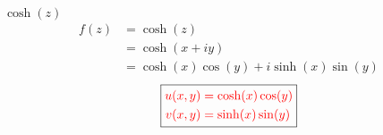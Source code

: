 \item[7.] $\cosh(z)$
\begin{align*}
    f(z) 
    &= \cosh(z) \\
    &= \cosh(x+iy) \\
    &= \cosh(x)\cos(y)+i\sinh(x)\sin(y)
\end{align*}
\[
\boxed{
\textcolor{red}{
\begin{aligned}
u(x,y) &= \cosh(x)\cos(y) \\
v(x,y) &= \sinh(x)\sin(y)
\end{aligned}
}
}
\]
